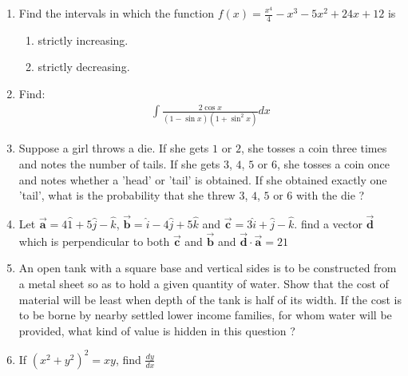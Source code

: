 \documentclass[10pt,-letter paper]{article}
\providecommand{\brak}[1]{\ensuremath{\left(#1\right)}}
\begin{document}
\begin{enumerate}
\item Find the intervals in which the function $f\brak{x}=\frac{x^4}{4}-x^{3}-5x^{2}+24x+12 $ is 
\begin{enumerate}
  \item strictly increasing.
 \item strictly decreasing.
\end{enumerate}
\item Find:
	\begin{align*}
		\int\frac{2\cos x}{\brak{1-\sin x}\brak{1+\sin^{2}x}}dx
	\end{align*}
\item  Suppose a girl throws a die. If she gets $1$ or $2$, she tosses a coin three times and notes the number of tails. If she gets $3$, $4$, $5$ or $6$, she tosses a coin once and notes whether a 'head' or 'tail' is obtained. If she obtained exactly one 'tail', what is the probability that she threw $3$, $4$, $5$ or $6$ with the die ? 
\item Let $\overrightarrow{\mathbf{a}}=4\hat{1}+5\hat{j}-\hat{k}$, $\overrightarrow{\mathbf{b}}=\hat{i}-4\hat{j}+5\hat{k}$ and $\overrightarrow{\mathbf{c}}=3\hat{i}+\hat{j}-\hat{k}$. find a vector $\overrightarrow{\mathbf{d}}$ which is perpendicular to both $\overrightarrow{\mathbf{c}}$ and $\overrightarrow{\mathbf{b}}$ and $\overrightarrow{\mathbf{d}}\cdot \overrightarrow{\mathbf{a}}=21$
\item An open tank with a square base and vertical sides is to be constructed from a metal sheet so as to hold a given quantity of water. Show that the cost of material will be least when depth of the tank is half of its width. If the cost is to be borne by nearby settled lower income families, for whom water will be provided, what kind of value is hidden in this question ?
\item If ${\brak{x^{2}+y^{2}}}^{2}=xy$, find $\frac{dy}{dx}$


\end{enumerate}
\end{document}
